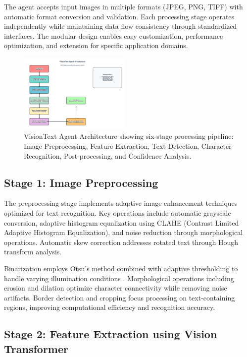 \documentclass[10pt,twocolumn]{article}
\begin{document}
The agent accepts input images in multiple formats (JPEG, PNG, TIFF) with automatic format conversion and validation. Each processing stage operates independently while maintaining data flow consistency through standardized interfaces. The modular design enables easy customization, performance optimization, and extension for specific application domains.

\begin{figure}[!htb]
\centering
\includegraphics[width=0.48\textwidth]{agent_architecture.png}
\caption{VisionText Agent Architecture showing six-stage processing pipeline: Image Preprocessing, Feature Extraction, Text Detection, Character Recognition, Post-processing, and Confidence Analysis.}
\label{fig:architecture}
\end{figure}

\subsection{Stage 1: Image Preprocessing}

The preprocessing stage implements adaptive image enhancement techniques optimized for text recognition. Key operations include automatic grayscale conversion, adaptive histogram equalization using CLAHE (Contrast Limited Adaptive Histogram Equalization), and noise reduction through morphological operations. Automatic skew correction addresses rotated text through Hough transform analysis.

Binarization employs Otsu's method combined with adaptive thresholding to handle varying illumination conditions \cite{otsu1979threshold}. Morphological operations including erosion and dilation optimize character connectivity while removing noise artifacts. Border detection and cropping focus processing on text-containing regions, improving computational efficiency and recognition accuracy.

\subsection{Stage 2: Feature Extraction using Vision Transformer}
\end{document}
